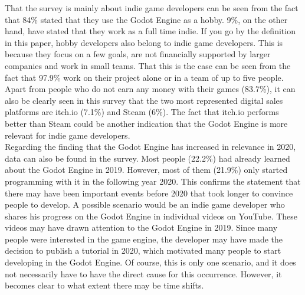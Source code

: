 That the survey is mainly about indie game developers can be seen from the fact that 84\% stated that they use the Godot Engine as a hobby.
9\%, on the other hand, have stated that they work as a full time indie.
If you go by the definition in this paper, hobby developers also belong to indie game developers.
This is because they focus on a few goals, are not financially supported by larger companies and work in small teams.
That this is the case can be seen from the fact that 97.9\% work on their project alone or in a team of up to five people.
Apart from people who do not earn any money with their games (83.7\%), it can also be clearly seen in this survey that the two most represented digital sales platforms are itch.io (7.1\%) and Steam (6\%).
The fact that itch.io performs better than Steam could be another indication that the Godot Engine is more relevant for indie game developers.\\

Regarding the finding that the Godot Engine has increased in relevance in 2020, data can also be found in the survey.
Most people (22.2\%) had already learned about the Godot Engine in 2019.
However, most of them (21.9\%) only started programming with it in the following year 2020.
This confirms the statement that there may have been important events before 2020 that took longer to convince people to develop. 
A possible scenario would be an indie game developer who shares his progress on the Godot Engine in individual videos on YouTube.
These videos may have drawn attention to the Godot Engine in 2019.
Since many people were interested in the game engine, the developer may have made the decision to publish a tutorial in 2020, which motivated many people to start developing in the Godot Engine.
Of course, this is only one scenario, and it does not necessarily have to have the direct cause for this occurrence.
However, it becomes clear to what extent there may be time shifts.


